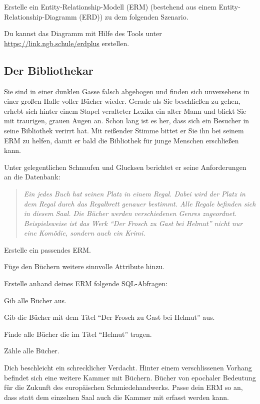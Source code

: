 \documentclass[11pt, a4paper, ngerman]{arbeitsblatt}
\begin{document}
\newpage
\ReiheTitel

\begin{aufgabe}
Erstelle ein Entity-Relationship-Modell (ERM) (bestehend aus einem Entity-Relationship-Diagramm
(ERD)) zu dem folgenden Szenario.

Du kannst das Diagramm mit Hilfe des Tools unter \url{https://link.ngb.schule/erdplus} erstellen.

\begin{rahmen}\vspace*{-1em}
	\subsection*{Der Bibliothekar}

	Sie sind in einer dunklen Gasse falsch abgebogen und finden sich unversehens in einer
	großen Halle voller Bücher wieder. Gerade als Sie beschließen zu gehen, erhebt sich
	hinter einem Stapel veralteter Lexika ein alter Mann und blickt Sie mit traurigen,
	grauen Augen an. Schon lang ist es her, dass sich ein Besucher in seine Bibliothek
	verirrt hat. Mit reißender Stimme bittet er Sie ihn bei seinem ERM zu helfen, damit
	er bald die Bibliothek für junge Menschen erschließen kann.

	Unter gelegentlichen Schnaufen und Glucksen berichtet er seine Anforderungen an die Datenbank:

	\begin{quote}\itshape
		Ein jedes Buch hat seinen Platz in einem Regal. Dabei wird der Platz in dem Regal durch
		das Regalbrett genauer bestimmt. Alle Regale befinden sich in diesem Saal. Die Bücher
		werden verschiedenen Genres zugeordnet. Beispielsweise ist das Werk \enquote{Der Frosch
		zu Gast bei Helmut} nicht nur eine Komödie, sondern auch ein Krimi.
	\end{quote}

	\begin{enuma}[noitemsep]
		\item Erstelle ein passendes ERM.
		\item Füge den Büchern weitere sinnvolle Attribute hinzu.
		\item Erstelle anhand deines ERM folgende SQL-Abfragen:
		\begin{smallenum}
			\item Gib alle Bücher aus.
			\item Gib die Bücher mit dem Titel \enquote{Der Frosch zu Gast bei Helmut} aus.
			\item Finde alle Bücher die im Titel \enquote{Helmut} tragen.
			\item Zähle alle Bücher.
		\end{smallenum}
		\smallskip
		\item Dich beschleicht ein schrecklicher Verdacht. Hinter einem verschlissenen Vorhang
		befindet sich eine weitere Kammer mit Büchern. Bücher von epochaler Bedeutung für die
		Zukunft des europäischen Schmiedehandwerks. Passe dein ERM so an, dass statt dem einzelnen
		Saal auch die Kammer mit erfasst werden kann.
	\end{enuma}
\end{rahmen}
\end{aufgabe}
\end{document}
